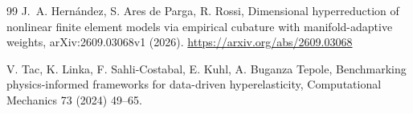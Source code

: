 \begin{thebibliography}{99}
J.~A. Hern\'andez, S. Ares de Parga, R. Rossi,
Dimensional hyperreduction of nonlinear finite element models via empirical cubature with manifold-adaptive weights,
arXiv:2609.03068v1 (2026).
\url{https://arxiv.org/abs/2609.03068}

V. Tac, K. Linka, F. Sahli-Costabal, E. Kuhl, A. Buganza Tepole,
Benchmarking physics-informed frameworks for data-driven hyperelasticity,
Computational Mechanics 73 (2024) 49--65.

\end{thebibliography}
